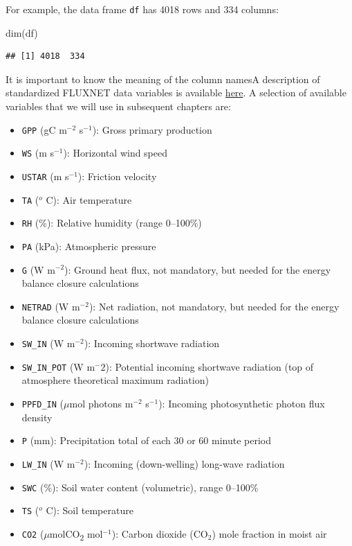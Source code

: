 \documentclass[
]{book}
\newenvironment{Shaded}{\begin{snugshade}}{\end{snugshade}}
\newcommand{\FunctionTok}[1]{\textcolor[rgb]{0.00,0.00,0.00}{#1}}
\newcommand{\NormalTok}[1]{#1}
\providecommand{\tightlist}{%
  \setlength{\itemsep}{0pt}\setlength{\parskip}{0pt}}
\begin{document}
For example, the data frame \texttt{df} has 4018 rows and 334 columns:

\begin{Shaded}
\begin{Highlighting}[]
\FunctionTok{dim}\NormalTok{(df)}
\end{Highlighting}
\end{Shaded}

\begin{verbatim}
## [1] 4018  334
\end{verbatim}

It is important to know the meaning of the column namesA description of standardized FLUXNET data variables is available \href{https://fluxnet.org/data/aboutdata/data-variables/}{here}. A selection of available variables that we will use in subsequent chapters are:

\begin{itemize}
\tightlist
\item
  \texttt{GPP} (gC m\(^{−2}\) s\(^{-1}\)): Gross primary production
\item
  \texttt{WS} (m s\(^{-1}\)): Horizontal wind speed
\item
  \texttt{USTAR} (m s\(^{-1}\)): Friction velocity
\item
  \texttt{TA} (\(^{o}\) C): Air temperature
\item
  \texttt{RH} (\%): Relative humidity (range 0--100\%)
\item
  \texttt{PA} (kPa): Atmospheric pressure
\item
  \texttt{G} (W m\(^{−2}\)): Ground heat flux, not mandatory, but needed for the energy balance closure calculations
\item
  \texttt{NETRAD} (W m\(^{−2}\)): Net radiation, not mandatory, but needed for the energy balance closure calculations
\item
  \texttt{SW\_IN} (W m\(^{−2}\)): Incoming shortwave radiation
\item
  \texttt{SW\_IN\_POT} (W m\(^−2\)): Potential incoming shortwave radiation (top of atmosphere theoretical maximum radiation)
\item
  \texttt{PPFD\_IN} (\(\mu\)mol photons m\(^{−2}\) s\(^{-1}\)): Incoming photosynthetic photon flux density
\item
  \texttt{P} (mm): Precipitation total of each 30 or 60 minute period
\item
  \texttt{LW\_IN} (W m\(^{−2}\)): Incoming (down-welling) long-wave radiation
\item
  \texttt{SWC} (\%): Soil water content (volumetric), range 0--100\%
\item
  \texttt{TS} (\(^{o}\) C): Soil temperature
\item
  \texttt{CO2} (\(\mu\)molCO\textsubscript{2} mol\(^{-1}\)): Carbon dioxide (CO\(_2\)) mole fraction in moist air
\end{itemize}
\end{document}
